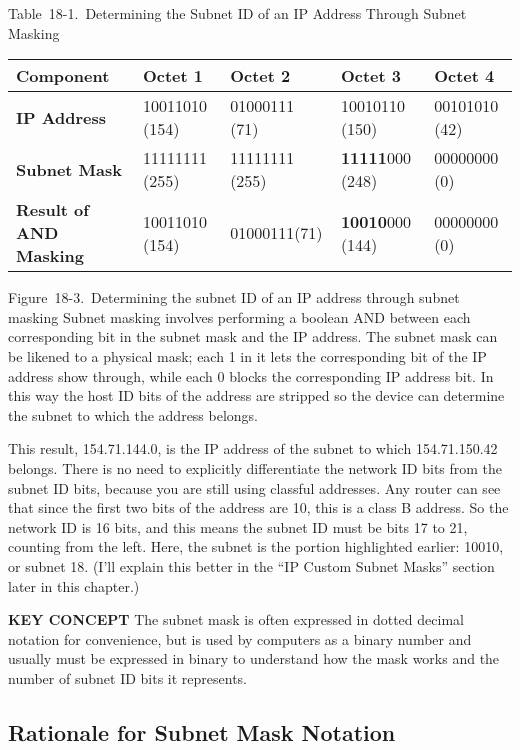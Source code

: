 Table~18-1.~Determining the Subnet ID of an IP Address Through Subnet
Masking

\begin{longtable}[]{@{}lllll@{}}
\toprule
Component & Octet 1 & Octet 2 & Octet 3 & Octet 4\tabularnewline
\midrule
\endhead
{\textbf{IP Address}} & 10011010 (154) & 01000111 (71) & 10010110 (150)
& 00101010 (42)\tabularnewline
{\textbf{Subnet Mask}} & 11111111 (255) & 11111111 (255) &
{\textbf{11111}}000 (248) & 00000000 (0)\tabularnewline
{\textbf{Result of AND Masking}} & 10011010 (154) & 01000111(71) &
{\textbf{10010}}000 (144) & 00000000 (0)\tabularnewline
\bottomrule
\end{longtable}





Figure~18-3.~Determining the subnet ID of an IP address through subnet
masking Subnet masking involves performing a boolean AND between each
corresponding bit in the subnet mask and the IP address. The subnet mask
can be likened to a physical mask; each 1 in it lets the corresponding
bit of the IP address show through, while each 0 blocks the
corresponding IP address bit. In this way the host ID bits of the
address are stripped so the device can determine the subnet to which the
address belongs.

This result, 154.71.144.0, is the IP address of the subnet to which
154.71.150.42 belongs. There is no need to explicitly differentiate the
network ID
bits from the subnet ID bits, because you are still using classful
addresses. Any router can see that since the first two bits of the
address are 10, this is a class B address. So the network ID is 16 bits,
and this means the subnet ID must be bits 17 to 21, counting from the
left. Here, the subnet is the portion highlighted earlier: 10010, or
subnet 18. (I'll explain this better in the ``IP Custom Subnet Masks''
section later in this chapter.)


{\textbf{KEY CONCEPT}} The subnet mask is often expressed in dotted
decimal notation for convenience, but is used by computers as a binary
number and usually must be expressed in binary to understand how the
mask works and the number of subnet ID bits it represents.



\subsection{Rationale for Subnet Mask Notation}

